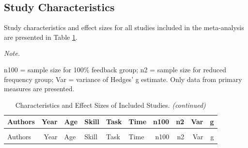\documentclass[
  english,
  man, donotrepeattitle,floatsintext]{apa7}
\begin{document}
\hypertarget{study-characteristics}{%
\subsection{Study Characteristics}\label{study-characteristics}}

Study characteristics and effect sizes for all studies included in the meta-analysis are presented in Table \ref{tab:table1}.

\begingroup\fontsize{10}{12}\selectfont

\begin{landscape}
\begin{ThreePartTable}
\begin{TableNotes}
\item \textit{Note.} 
\item n100 = sample size for 100\% feedback group; n2 = sample size for reduced frequency group; Var = variance of Hedges' g estimate. Only data from primary measures are presented.
\end{TableNotes}
\begin{longtable}[l]{lrllllrrrr}
\caption{\label{tab:table1}Characteristics and Effect Sizes of Included Studies.}\\
\toprule
Authors & Year & Age & Skill & Task & Time & n100 & n2 & Var & g\\
\midrule
\endfirsthead
\caption[]{\label{tab:table1}Characteristics and Effect Sizes of Included Studies. \textit{(continued)}}\\
\toprule
Authors & Year & Age & Skill & Task & Time & n100 & n2 & Var & g\\
\midrule
\endhead


\end{longtable}
\end{ThreePartTable}
\end{landscape}
\end{document}
